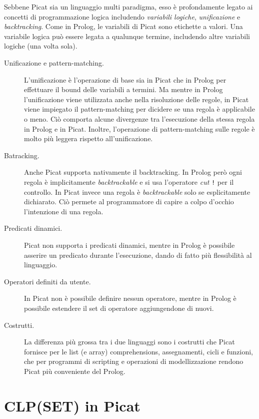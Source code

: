 \documentclass[12pt,a4paper,openright]{book} %
\begin{document}
Sebbene Picat sia un linguaggio multi paradigma, esso è profondamente legato ai concetti di programmazione logica includendo \emph{variabili logiche}, \emph{unificazione} e \emph{backtracking}.
Come in Prolog, le variabili di Picat sono etichette a valori. Una variabile logica può essere legata a qualunque termine, includendo altre variabili logiche (una volta sola).

\begin{description}
\item[Unificazione e pattern-matching.] L'unificazione è l'operazione di base sia in Picat che in Prolog per effettuare il bound delle variabili a termini. Ma mentre in Prolog l'unificazione viene utilizzata anche nella risoluzione delle regole, in Picat viene impiegato il pattern-matching per dicidere se una regola è applicabile o meno. Ciò comporta alcune divergenze tra l'esecuzione della stessa regola in Prolog e in Picat.
Inoltre, l'operazione di pattern-matching sulle regole è molto più leggera rispetto all'unificazione.
\item[Batracking.] Anche Picat supporta nativamente il backtracking. In Prolog però ogni regola è implicitamente \emph{backtrackable} e si usa l'operatore \emph{cut} \verb|!| per il controllo. In Picat invece una regola è \emph{backtrackable} solo se esplicitamente dichiarato. Ciò permete al programmatore di capire a colpo d'occhio l'intenzione di una regola.
\item[Predicati dinamici.] Picat non supporta i predicati dinamici, mentre in Prolog è possibile asserire un predicato durante l'esecuzione, dando di fatto più flessibilità al linguaggio.
\item[Operatori definiti da utente.] In Picat non è possibile definire nessun operatore, mentre in Prolog è possibile estendere il set di operatore aggiungendone di nuovi.
\item[Costrutti.] La differenza più grossa tra i due linguaggi sono i costrutti che Picat fornisce per le list (e array) comprehensions, assegnamenti, cicli e funzioni, che per programmi di scripting e operazioni di modellizzazione rendono Picat più conveniente del Prolog.
\end{description}


\chapter{CLP(SET) in Picat}
\label{ch:clpsetpicat}
\end{document}
